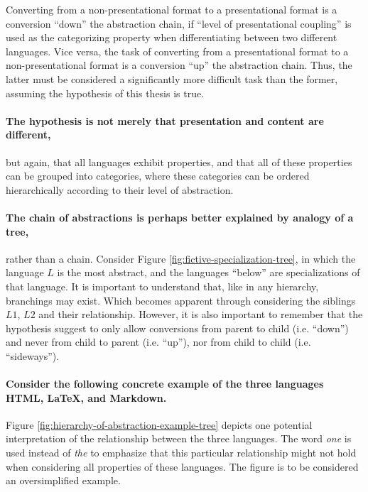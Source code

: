 \documentclass{scrreprt}
\begin{document}
Converting from a non-presentational format to a presentational format is a conversion ``down'' the abstraction chain, if ``level of presentational coupling'' is used as the categorizing property when differentiating between two different languages. Vice versa, the task of converting from a presentational format to a non-presentational format is a conversion ``up'' the abstraction chain. Thus, the latter must be considered a significantly more difficult task than the former, assuming the hypothesis of this thesis is true.

\paragraph{The hypothesis is not merely that presentation and content are different,} but again, that all languages exhibit properties, and that all of these properties can be grouped into categories, where these categories can be ordered hierarchically according to their level of abstraction.

\paragraph{The chain of abstractions is perhaps better explained by analogy of a tree,} rather than a chain. Consider Figure \ref{fig:fictive-specialization-tree}, in which the language $L$ is the most abstract, and the languages ``below'' are specializations of that language. It is important to understand that, like in any hierarchy, branchings may exist. Which becomes apparent through considering the siblings $L1$, $L2$ and their relationship. However, it is also important to remember that the hypothesis suggest to only allow conversions from parent to child (i.e. ``down'') and never from child to parent (i.e. ``up''), nor from child to child (i.e. ``sideways'').

\paragraph{Consider the following concrete example of the three languages HTML, \LaTeX, and Markdown.} Figure \ref{fig:hierarchy-of-abstraction-example-tree} depicts one potential interpretation of the relationship between the three languages. The word \emph{one} is used instead of \emph{the} to emphasize that this particular relationship might not hold when considering all properties of these languages. The figure is to be considered an oversimplified example.
\end{document}
